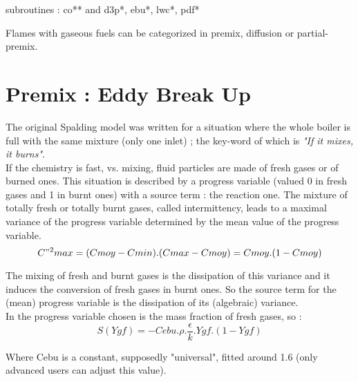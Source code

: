 {\huge subroutines : co** and d3p*, ebu*, lwc*, pdf*}

Flames with gaseous fuels can be categorized in premix, diffusion or
partial-premix.


\section{Premix : Eddy Break Up}

The original Spalding model \cite{1} was written for a situation where
the whole boiler is full with the same mixture ({\small only one
inlet}) ; the key-word of which is {\em"If it mixes, it burns"}.\\

If the chemistry is fast, vs. mixing, fluid particles are made of
fresh gases or of burned ones. This situation is described by a
progress variable ({\small valued 0 in fresh gases and 1 in burnt
ones}) with a source term : the reaction one. The mixture of totally
fresh or totally burnt gases, called intermittency, leads to a maximal
variance of the progress variable determined by the mean value of the
progress variable.\\
\begin{equation}
C"^{2} max = (Cmoy -Cmin).(Cmax-Cmoy) = Cmoy . (1-Cmoy)
\end{equation}


The mixing of fresh and burnt gases is the dissipation of this
variance and it induces the conversion of fresh gases in burnt
ones. So the source term for the ({\small mean}) progress variable is
the dissipation of its ({\small algebraic}) variance.\\

In \CS the progress variable chosen is the mass fraction of fresh
gases, so :\\
\begin{equation}
S(Ygf) = - Cebu . \rho . \frac{\epsilon}{k} . Ygf . (1-Ygf)
\end{equation}

Where Cebu is a constant, supposedly "universal", fitted around 1.6
({\small only advanced users can adjust this value}).\\


